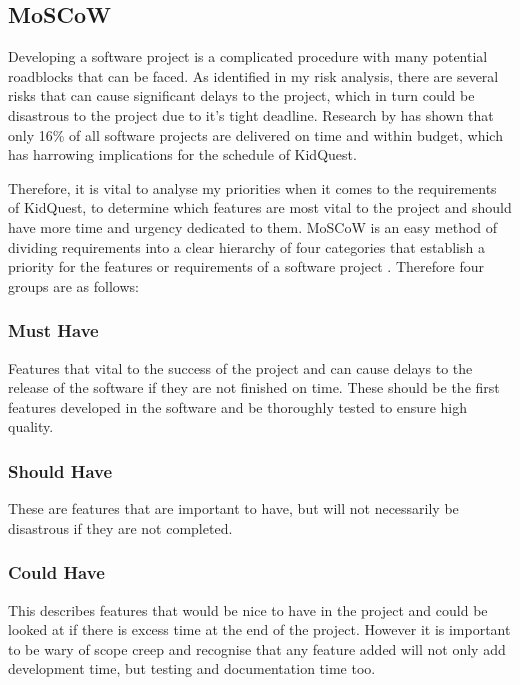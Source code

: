 
\subsection{MoSCoW}
Developing a software project is a complicated procedure with many potential roadblocks that can be faced.
As identified in my risk analysis, there are several risks that can cause significant delays to the project, which in turn could be disastrous to the project due to it's tight deadline.
Research by \cite{requirementsprioritization} has shown that only 16\% of all software projects are delivered on time and within budget, which has harrowing implications for the schedule of KidQuest.

Therefore, it is vital to analyse my priorities when it comes to the requirements of KidQuest, to determine which features are most vital to the project and should have more time and urgency dedicated to them.
MoSCoW is an easy method of dividing requirements into a clear hierarchy of four categories that establish a priority for the features or requirements of a software project \citep[p.517]{hatton2008choosing}.
Therefore four groups are as follows:

\subsubsection{Must Have}
Features that vital to the success of the project and can cause delays to the release of the software if they are not finished on time.
These should be the first features developed in the software and be thoroughly tested to ensure high quality.

\subsubsection{Should Have}
These are features that are important to have, but will not necessarily be disastrous if they are not completed.

\subsubsection{Could Have}
This describes features that would be nice to have in the project and could be looked at if there is excess time at the end of the project.
However it is important to be wary of scope creep and recognise that any feature added will not only add development time, but testing and documentation time too.

